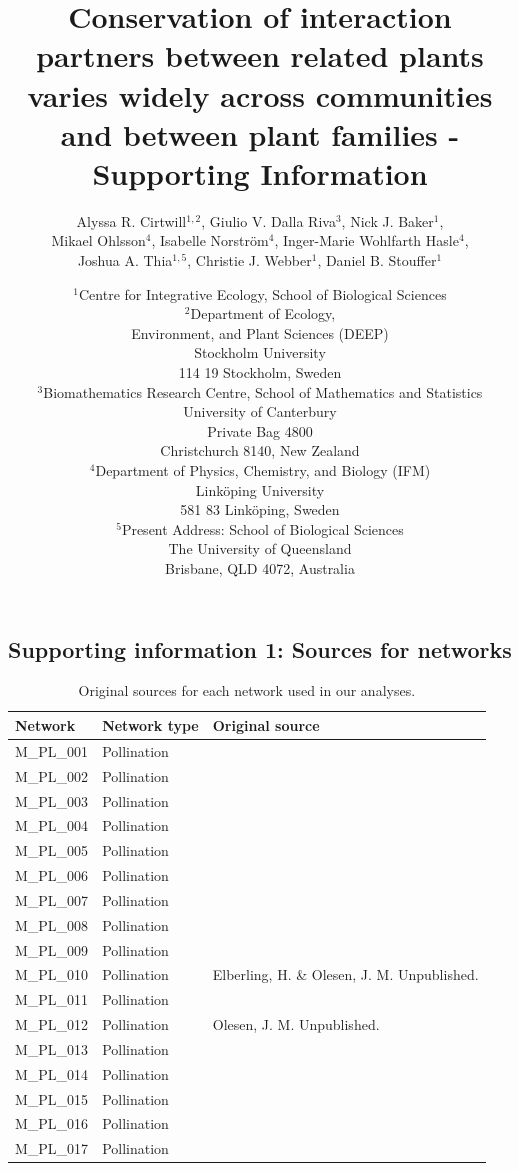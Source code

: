 \documentclass[12pt]{article}
\title{Conservation of interaction partners between related plants varies widely across communities and between plant families - Supporting Information}
\author{Alyssa R. Cirtwill$^{1,2}$, Giulio V. Dalla Riva$^{3}$, Nick J. Baker$^{1}$,\\
Mikael Ohlsson$^{4}$, Isabelle Norstr\"{o}m$^{4}$, Inger-Marie Wohlfarth Hasle$^{4}$,\\
Joshua A. Thia$^{1,5}$, Christie J. Webber$^{1}$, Daniel B. Stouffer$^{1}$}
\date{\small$^1$Centre for Integrative Ecology, School of Biological Sciences\\
\medskip$^2$Department of Ecology,\\
Environment, and Plant Sciences (DEEP)\\
Stockholm University\\
114 19 Stockholm, Sweden\\
\medskip$^3$Biomathematics Research Centre, School of Mathematics and Statistics\\
University of Canterbury\\Private Bag 4800\\
Christchurch 8140, New Zealand\\
\medskip$^4$Department of Physics, Chemistry, and Biology (IFM)\\ Link\"{o}ping University\\ 581 83 Link\"{o}ping, Sweden\\
\medskip$^5$Present Address: School of Biological Sciences\\
The University of Queensland\\Brisbane, QLD 4072, Australia }
\newcommand{\beginsupplement}{%
        \setcounter{table}{0}
        \renewcommand{\thetable}{S\arabic{table}}%
        \setcounter{figure}{0}
        \renewcommand{\thefigure}{S\arabic{figure}}%
     }
\begin{document}
\maketitle
\baselineskip=8.5mm
\begin{spacing}{1.0}

\beginsupplement
\clearpage

\section*{Supporting information 1: Sources for networks}
  \begin{table}[!h]
    \caption{Original sources for each network used in our analyses.}
    \label{sources}
    \begin{center}
    \begin{tabular}{|l l m{10cm} |}
    \hline
    Network & Network type & Original source \\
    \hline
    M\_PL\_001  & Pollination & \citep{Arroyo1982}  \\
    M\_PL\_002  & Pollination & \citep{Arroyo1982}  \\
    M\_PL\_003  & Pollination & \citep{Arroyo1982}  \\
    M\_PL\_004  & Pollination & \citep{Barrett1987} \\
    M\_PL\_005  & Pollination & \citep{Clements1923}  \\
    M\_PL\_006  & Pollination & \citep{Dicks2002} \\
    M\_PL\_007  & Pollination & \citep{Dicks2002} \\
    M\_PL\_008  & Pollination & \citep{Dupont2003}  \\
    M\_PL\_009  & Pollination & \citep{Elberling1999} \\
    M\_PL\_010  & Pollination & Elberling, H. \& Olesen, J. M. Unpublished. \\
    M\_PL\_011  & Pollination & \citep{Olesen2002a}  \\
    M\_PL\_012  & Pollination & Olesen, J. M. Unpublished.  \\
    M\_PL\_013  & Pollination & \citep{Ollerton2003}  \\
    M\_PL\_014  & Pollination & \citep{Hocking1968} \\
    M\_PL\_015  & Pollination & \citep{Petanidou1991} \\
    M\_PL\_016  & Pollination & \citep{Herrera1988} \\
    M\_PL\_017  & Pollination & \citep{Memmott2002} \\

\end{tabular}
\end{center}
\end{table}
\end{spacing}
\end{document}
